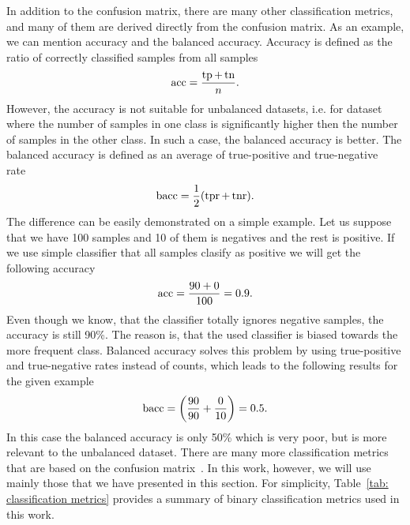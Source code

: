 In addition to the confusion matrix, there are many other classification metrics, and many of them are derived directly from the confusion matrix. As an example, we can mention accuracy and the balanced accuracy. Accuracy is defined as the ratio of correctly classified samples from all samples~\cite{metz1978basic}
\begin{equation*}
  \operatorname{acc} = \frac{\operatorname{tp} + \operatorname{tn}}{n}.
\end{equation*}
However, the accuracy is not suitable for unbalanced datasets, i.e. for dataset where the number of samples in one class is significantly higher then the number of samples in the other class. In such a case, the balanced accuracy is better. The balanced accuracy is defined as an average of true-positive and true-negative rate~\cite{brodersen2010balanced}
\begin{equation*}
  \baccuracy = \frac{1}{2}\Brac{\tpr + \tnr}.
\end{equation*}
The difference can be easily demonstrated on a simple example. Let us suppose that we have 100 samples and 10 of them is negatives and the rest is positive. If we use simple classifier that all samples clasify as positive we will get the following accuracy
\begin{equation*}
  \operatorname{acc} = \frac{90 + 0}{100} = 0.9.
\end{equation*}
Even though we know, that the classifier totally ignores negative samples, the accuracy is still 90\%. The reason is, that the used classifier is biased towards the more frequent class. Balanced accuracy solves this problem by using true-positive and true-negative rates instead of counts, which leads to the following results for the given example
\begin{equation*}
  \baccuracy = \Brac{\frac{90}{90} + \frac{0}{10}} = 0.5.
\end{equation*}
In this case the balanced accuracy is only 50\% which is very poor, but is more relevant to the unbalanced dataset. There are many more classification metrics that are based on the confusion matrix~\cite{fawcett2006introduction, metz1978basic, brodersen2010balanced, hossin2015review}. In this work, however, we will use mainly those that we have presented in this section. For simplicity, Table~\ref{tab: classification metrics} provides a summary of binary classification metrics used in this work. 

